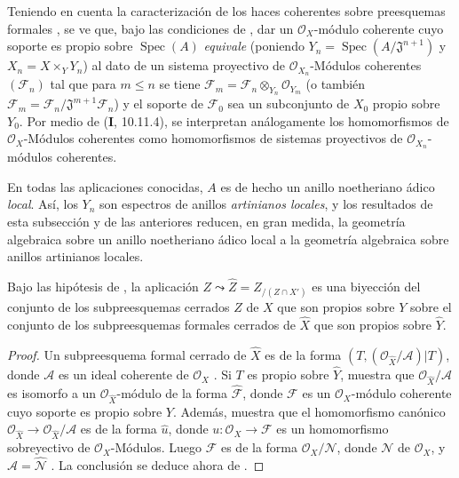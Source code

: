 \begin{scholium}[5.1.7]
\label{III.5.1.7}
\label{III.5.1.7-fr}
Teniendo en cuenta la caracterización de los haces coherentes sobre
preesquemas formales , se ve que, bajo las
condiciones de , dar un
$\mathcal O_X$-módulo coherente cuyo soporte es propio sobre $\operatorname{Spec}(A)$ \emph{equivale} (poniendo
$Y_n=\operatorname{Spec}(A/\mathfrak J^{n+1})$ y $X_n=X\times_Y Y_n$) al dato
de un sistema proyectivo de $\mathcal O_{X_n}$-Módulos coherentes $(\mathcal F_n)$ tal
que para $m\leq n$ se tiene
$\mathcal F_m=\mathcal F_n\otimes_{Y_n}\mathcal O_{Y_m}$
(o también $\mathcal F_m=\mathcal F_n/\mathfrak J^{m+1}\mathcal F_n$)
y el soporte de $\mathcal F_0$ sea un subconjunto de $X_0$
propio sobre $Y_0$. Por medio de (\textbf{I}, 10.11.4), se interpretan análogamente los homomorfismos de $\mathcal O_X$-Módulos coherentes como homomorfismos de sistemas proyectivos de $\mathcal O_{X_n}$-módulos coherentes.


En todas las aplicaciones conocidas, $A$ es de hecho un anillo
noetheriano ádico \emph{local}. Así, los $Y_n$ son espectros de anillos
\emph{artinianos locales}, y los resultados de esta subsección y de las
anteriores reducen, en gran medida, la geometría algebraica sobre un
anillo noetheriano ádico local a la geometría algebraica sobre anillos
artinianos locales.
\end{scholium}

\begin{corollary}[5.1.8]
\label{III.5.1.8}
\label{III.5.1.8-fr}
Bajo las hipótesis de , la aplicación
$Z\leadsto\widehat Z=Z_{/(Z\cap X')}$
es una biyección del conjunto de los subpreesquemas cerrados $Z$ de $X$
que son propios sobre $Y$ sobre el conjunto de los subpreesquemas
formales cerrados de $\widehat X$ que son propios sobre
$\widehat Y$.
\end{corollary}

\begin{proof}
Un subpreesquema formal cerrado de $\widehat X$ es de la forma
$(T,(\mathcal O_{\widehat X}/\mathcal A)|T)$,
donde $\mathcal A$ es un ideal coherente de
$\mathcal O_X$ . Si $T$ es propio sobre
$\widehat Y$,  muestra que
$\mathcal O_{\widehat X}/\mathcal A$ es isomorfo a un
$\mathcal O_{\widehat X}$-módulo de la forma
$\widehat{\mathcal F}$, donde $\mathcal F$ es un
$\mathcal O_X$-módulo coherente cuyo soporte es propio sobre $Y$. Además,
 muestra que el homomorfismo canónico
$\mathcal O_{\widehat X}\to\mathcal O_{\widehat X}/\mathcal A$
es de la forma $\widehat u$, donde
$u:\mathcal O_X\to\mathcal F$ es un homomorfismo sobreyectivo de
$\mathcal O_X$-Módulos. Luego $\mathcal F$ es de la forma
$\mathcal O_X/\mathcal N$, donde $\mathcal N$ de
$\mathcal O_X$, y
$\mathcal A=\widehat{\mathcal N}$ . La conclusión se
deduce ahora de .
\end{proof}


